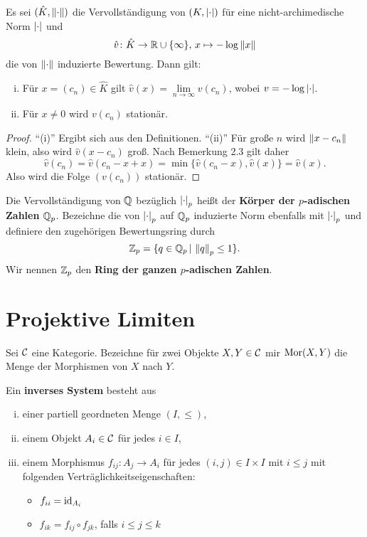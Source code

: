 \begin{Bem}
Es sei $(\hat{K}, \left\|{\cdot}\right\|)$ die Vervollständigung von $(K, \left|{\cdot}\right|)$ für eine nicht-archimedische Norm $\left|{\cdot}\right|$ und 
\[ \hat{v} \colon \hat{K} \to \mathbb{R}\cup\{\infty \}, \, x \mapsto - \log \left\|{x}\right\|
\]
die von $\left\|{\cdot}\right\|$ induzierte Bewertung. Dann gilt:
\begin{enumerate}[(i)]
\item Für $x=(c_n) \in\hat{K}$ gilt $\hat{v}(x) = \lim\limits_{n\to\infty} v(c_n)$, wobei $v = - \log\left|{\cdot}\right|$.
\item Für $x\neq 0$ wird $v(c_n)$ stationär.
\end{enumerate}
\end{Bem}

\begin{proof}
\enquote{(i)} Ergibt sich aus den Definitionen.
\enquote{(ii)} Für große $n$ wird $\left\|{x-c_n}\right\|$ klein, also wird $\hat{v}(x-c_n)$ groß.
Nach Bemerkung 2.3 gilt daher
\[ \hat{v}(c_n) = \hat{v}(c_n-x+x) = \min \{ \hat{v}(c_n-x), \hat{v}(x) \} = \hat{v}(x).
\]
Also wird die Folge $(v(c_n))$ stationär.
\end{proof}


\begin{defi}
Die Vervollständigung von $\mathbb{Q}$ bezüglich $\left|{\cdot}\right|_p$ heißt der \textbf{Körper der $p$-adischen Zahlen} $\mathbb{Q}_p$. Bezeichne die von $\left|{\cdot}\right|_p$ auf $\mathbb{Q}_p$ induzierte Norm ebenfalls mit 
$\left|{\cdot}\right|_p$ und definiere den zugehörigen Bewertungsring durch
\[ \mathbb{Z}_p = \{  q \in \mathbb{Q}_p \,|\, \left\|{q}\right\|_p \leq 1 \}.
\]
Wir nennen $\mathbb{Z}_p$ den \textbf{Ring der ganzen $p$-adischen Zahlen}.
\end{defi}


\section{Projektive Limiten}
Sei $\mathcal{C}$ eine Kategorie. Bezeichne für zwei Objekte $X, Y \in \mathcal{C}$ mir $\operatorname{Mor}(X,Y)$ die Menge der Morphismen von $X$ nach $Y$.

\begin{defi}
Ein \textbf{inverses System} besteht aus
\begin{enumerate}[(i)]
\item einer partiell geordneten Menge $(I,\leq)$,
\item einem Objekt $A_i\in\mathcal{C}$ für jedes $i\in I$,
\item einem Morphismus $f_{ij} \colon A_j \to A_i$ für jedes $(i,j) \in I \times I$ mit $i\leq j$ mit folgenden Verträglichkeitseigenschaften:
\begin{itemize}
\item $f_{ii} = \operatorname{id}_{A_i}$
\item $f_{ik} = f_{ij} \circ f_{jk}$, falls $i \leq j \leq k$
\end{itemize}
\end{enumerate}
\end{defi}


